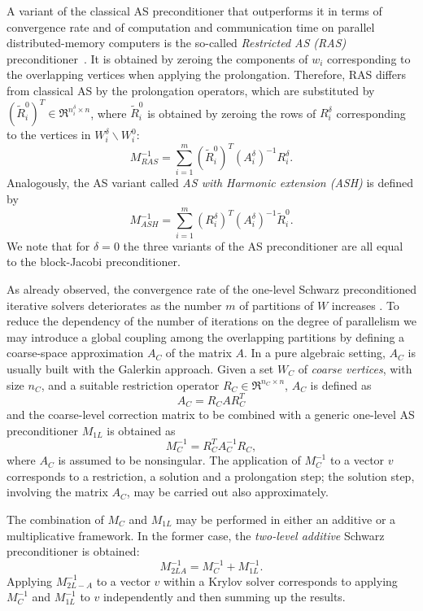 A variant of the classical AS preconditioner that outperforms it
in terms of convergence rate and of computation and communication
time on parallel distributed-memory computers is the so-called \emph{Restricted AS
(RAS)} preconditioner~\cite{CAI_SARKIS,EFSTATHIOU}. It
is obtained by zeroing the components of $w_i$ corresponding to the
overlapping vertices when applying the prolongation. Therefore,
RAS differs from classical AS by the prolongation operators,
which are substituted by $(\tilde{R}_i^0)^T \in \Re^{n_i^\delta \times n}$,
where $\tilde{R}_i^0$ is obtained by zeroing the rows of $R_i^\delta$
corresponding to the vertices in $W_i^\delta \backslash W_i^0$:
\[
M_{RAS}^{-1}= \sum_{i=1}^m (\tilde{R}_i^0)^T 
(A_i^\delta)^{-1} R_i^{\delta}.
\]
Analogously, the AS variant called \emph{AS with Harmonic extension (ASH)}
is defined by
\[ M_{ASH}^{-1}= \sum_{i=1}^m (R_i^{\delta})^T 
(A_i^\delta)^{-1} \tilde{R}_i^0.
\]
We note that for $\delta=0$ the three variants of the AS preconditioner are
all equal to the block-Jacobi preconditioner.

As already observed, the convergence rate of the one-level Schwarz
preconditioned iterative solvers deteriorates as the number $m$ of partitions
of $W$ increases \cite{dd1_94,dd2_96}. To reduce the dependency
of the number of iterations on the degree of parallelism we may
introduce a global coupling among the overlapping partitions by defining 
a coarse-space approximation $A_C$ of the matrix $A$. 
In a pure algebraic setting, $A_C$ is usually built with
the Galerkin approach. Given a set $W_C$ of \emph{coarse vertices},
with size $n_C$, and a suitable restriction operator
$R_C \in \Re^{n_C \times n}$, $A_C$ is defined as
\[
A_C=R_C A R_C^T
\]
and the coarse-level correction matrix to be combined with a generic
one-level AS preconditioner $M_{1L}$ is obtained as
\[
M_{C}^{-1}= R_C^T A_C^{-1} R_C,
\]
where $A_C$ is assumed to be nonsingular. The application of $M_{C}^{-1}$
to a vector $v$ corresponds to a restriction, a solution and
a prolongation step; the solution step, involving the matrix $A_C$,
may be carried out also approximately.

The combination of $M_{C}$ and $M_{1L}$ may be
performed in either an additive or a multiplicative framework.
In the former case, the \emph{two-level additive} Schwarz preconditioner
is obtained:
\[
M_{2LA}^{-1} = M_{C}^{-1} + M_{1L}^{-1}. 
\]
Applying $M_{2L-A}^{-1}$ to a vector $v$ within a Krylov solver
corresponds to applying $M_{C}^{-1}$
and $M_{1L}^{-1}$ to $v$ independently and then summing up
the results.

